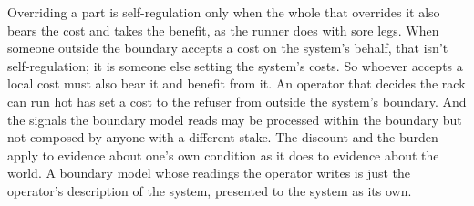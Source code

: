 Overriding a part is self-regulation only when the whole that overrides it also bears the cost and takes the benefit, as the runner does with sore legs. When someone outside the boundary accepts a cost on the system's behalf, that isn't self-regulation; it is someone else setting the system's costs. So whoever accepts a local cost must also bear it and benefit from it. An operator that decides the rack can run hot has set a cost to the refuser from outside the system's boundary. And the signals the boundary model reads may be processed within the boundary but not composed by anyone with a different stake. The discount and the burden apply to evidence about one's own condition as it does to evidence about the world. A boundary model whose readings the operator writes is just the operator's description of the system, presented to the system as its own.

